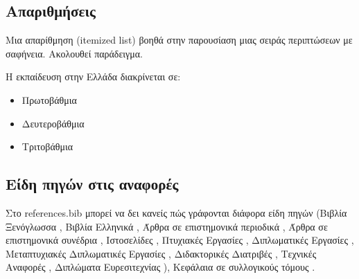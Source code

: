 \subsection{Απαριθμήσεις}

Μια απαρίθμηση (itemized list) βοηθά στην παρουσίαση μιας σειράς περιπτώσεων με σαφήνεια.
Ακολουθεί παράδειγμα.

H εκπαίδευση στην Ελλάδα διακρίνεται σε:
\begin{itemize}
\item Πρωτοβάθμια 
\item Δευτεροβάθμια 
\item Τριτοβάθμια 
\end{itemize}

\subsection{Είδη πηγών στις αναφορές}

Στο references.bib μπορεί να δει κανείς πώς γράφονται διάφορα είδη πηγών 
(Βιβλία Ξενόγλωσσα \cite{goossens93},
Βιβλία Ελληνικά \cite{greekbook},
Άρθρα σε επιστημονικά περιοδικά \cite{LiArTs13},
Άρθρα σε επιστημονικά συνέδρια \cite{dcis2011},
Ιστοσελίδες \cite{Docker},
Πτυχιακές Εργασίες \cite{elli05},
Διπλωματικές Εργασίες \cite{zoi04},
Μεταπτυχιακές Διπλωματικές Εργασίες \cite{master04},
Διδακτορικές Διατριβές \cite{phd045},
Τεχνικές Αναφορές \cite{MSU-CSE-05-29},
Διπλώματα Ευρεσιτεχνίας \cite{viswanathan2014convenient}),
Κεφάλαια σε συλλογικούς τόμους
\cite{[PS11]}.

